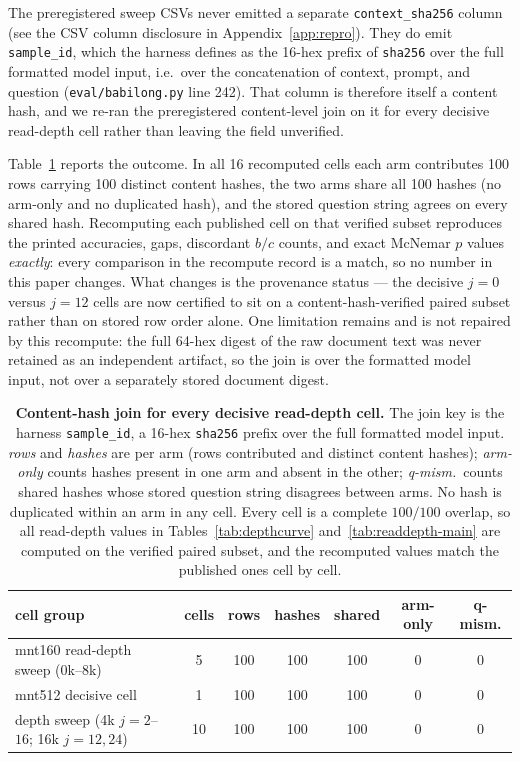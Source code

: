 The preregistered sweep CSVs never emitted a separate \texttt{context\_sha256}
column (see the CSV column disclosure in Appendix~\ref{app:repro}).  They do
emit \texttt{sample\_id}, which the harness defines as the 16-hex prefix of
\texttt{sha256} over the full formatted model input, i.e.\ over the
concatenation of context, prompt, and question
(\texttt{eval/babilong.py} line 242).  That column is therefore itself a
content hash, and we re-ran the preregistered content-level join on it for
every decisive read-depth cell rather than leaving the field unverified.

Table~\ref{tab:pairing-join} reports the outcome.  In all 16 recomputed cells
each arm contributes 100 rows carrying 100 distinct content hashes, the two
arms share all 100 hashes (no arm-only and no duplicated hash), and the stored
question string agrees on every shared hash.  Recomputing each published cell
on that verified subset reproduces the printed accuracies, gaps, discordant
$b/c$ counts, and exact McNemar $p$ values \emph{exactly}: every comparison in
the recompute record is a match, so no number in this paper changes.  What
changes is the provenance status --- the decisive $j{=}0$ versus $j{=}12$ cells
are now certified to sit on a content-hash-verified paired subset rather than
on stored row order alone.  One limitation remains and is not repaired by this
recompute: the full 64-hex digest of the raw document text was never retained
as an independent artifact, so the join is over the formatted model input, not
over a separately stored document digest.

\begin{table}[htbp]
\centering
\footnotesize
\setlength{\tabcolsep}{4pt}
\begin{tabular}{@{}>{\raggedright\arraybackslash}p{}cccccc@{}}
\toprule
\textbf{cell group} & \textbf{cells} & \textbf{rows} &
\textbf{hashes} & \textbf{shared} & \textbf{arm-only} &
\textbf{q-mism.} \\
\midrule
mnt160 read-depth sweep (0k--8k)          & 5  & 100 & 100 & 100 & 0 & 0 \\
mnt512 decisive cell                      & 1  & 100 & 100 & 100 & 0 & 0 \\
depth sweep (4k $j{=}2$--$16$; 16k $j{=}12,24$) & 10 & 100 & 100 & 100 & 0 & 0 \\
\bottomrule
\end{tabular}
\caption{\textbf{Content-hash join for every decisive read-depth cell.}
The join key is the harness \texttt{sample\_id}, a 16-hex \texttt{sha256}
prefix over the full formatted model input.  \emph{rows} and \emph{hashes} are
per arm (rows contributed and distinct content hashes); \emph{arm-only} counts
hashes present in one arm and absent in the other; \emph{q-mism.}\ counts shared
hashes whose stored question string disagrees between arms.  No hash is
duplicated within an arm in any cell.  Every cell is a complete $100/100$
overlap, so all read-depth values in Tables~\ref{tab:depthcurve}
and~\ref{tab:readdepth-main} are computed on the verified paired subset, and the
recomputed values match the published ones cell by cell.}
\label{tab:pairing-join}
\end{table}

